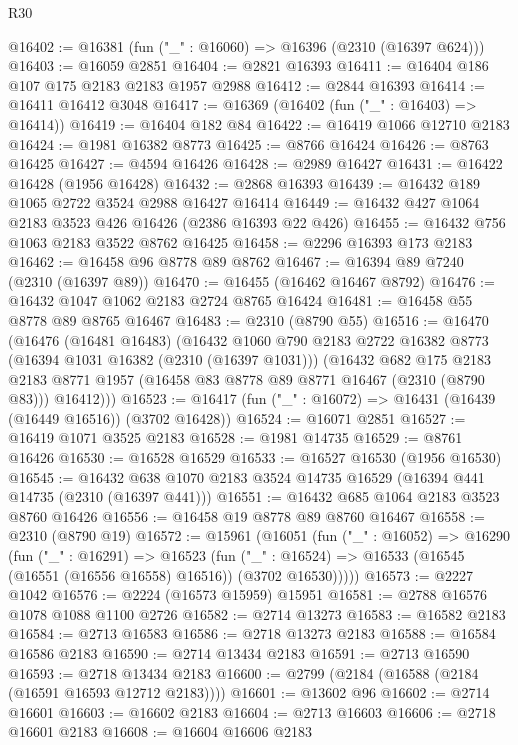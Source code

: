 \begin{lexlean}{R30}
\begin{coremodule}
@16402 := @16381 (fun ("_" : @16060) => @16396 (@2310 (@16397 @624)))
@16403 := @16059 @2851
@16404 := @2821 @16393
@16411 := @16404 @186 @107 @175 @2183 @2183 @1957 @2988
@16412 := @2844 @16393
@16414 := @16411 @16412 @3048
@16417 := @16369 (@16402 (fun ("_" : @16403) => @16414))
@16419 := @16404 @182 @84
@16422 := @16419 @1066 @12710 @2183
@16424 := @1981 @16382 @8773
@16425 := @8766 @16424
@16426 := @8763 @16425
@16427 := @4594 @16426
@16428 := @2989 @16427
@16431 := @16422 @16428 (@1956 @16428)
@16432 := @2868 @16393
@16439 := @16432 @189 @1065 @2722 @3524 @2988 @16427 @16414
@16449 := @16432 @427 @1064 @2183 @3523 @426 @16426 (@2386 @16393 @22 @426)
@16455 := @16432 @756 @1063 @2183 @3522 @8762 @16425
@16458 := @2296 @16393 @173 @2183
@16462 := @16458 @96 @8778 @89 @8762
@16467 := @16394 @89 @7240 (@2310 (@16397 @89))
@16470 := @16455 (@16462 @16467 @8792)
@16476 := @16432 @1047 @1062 @2183 @2724 @8765 @16424
@16481 := @16458 @55 @8778 @89 @8765 @16467
@16483 := @2310 (@8790 @55)
@16516 := @16470
    (@16476
      (@16481 @16483)
      (@16432
        @1060
        @790
        @2183
        @2722
        @16382
        @8773
        (@16394 @1031 @16382 (@2310 (@16397 @1031)))
        (@16432
          @682
          @175
          @2183
          @2183
          @8771
          @1957
          (@16458 @83 @8778 @89 @8771 @16467 (@2310 (@8790 @83)))
          @16412)))
@16523 := @16417 (fun ("_" : @16072) => @16431 (@16439 (@16449 @16516)) (@3702 @16428))
@16524 := @16071 @2851
@16527 := @16419 @1071 @3525 @2183
@16528 := @1981 @14735
@16529 := @8761 @16426
@16530 := @16528 @16529
@16533 := @16527 @16530 (@1956 @16530)
@16545 := @16432 @638 @1070 @2183 @3524 @14735 @16529 (@16394 @441 @14735 (@2310 (@16397 @441)))
@16551 := @16432 @685 @1064 @2183 @3523 @8760 @16426
@16556 := @16458 @19 @8778 @89 @8760 @16467
@16558 := @2310 (@8790 @19)
@16572 := @15961
    (@16051
      (fun ("_" : @16052) =>
      @16290
        (fun ("_" : @16291) =>
        @16523
          (fun ("_" : @16524) => @16533 (@16545 (@16551 (@16556 @16558) @16516)) (@3702 @16530)))))
@16573 := @2227 @1042
@16576 := @2224 (@16573 @15959) @15951
@16581 := @2788 @16576 @1078 @1088 @1100 @2726
@16582 := @2714 @13273
@16583 := @16582 @2183
@16584 := @2713 @16583
@16586 := @2718 @13273 @2183
@16588 := @16584 @16586 @2183
@16590 := @2714 @13434 @2183
@16591 := @2713 @16590
@16593 := @2718 @13434 @2183
@16600 := @2799 (@2184 (@16588 (@2184 (@16591 @16593 @12712 @2183))))
@16601 := @13602 @96
@16602 := @2714 @16601
@16603 := @16602 @2183
@16604 := @2713 @16603
@16606 := @2718 @16601 @2183
@16608 := @16604 @16606 @2183

\end{coremodule}
\end{lexlean}
